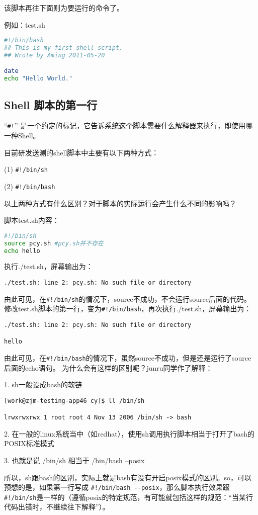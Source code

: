 该脚本再往下面则为要运行的命令了。

例如：test.sh
\begin{lstlisting}[language=sh]
#!/bin/bash
## This is my first shell script.
## Wrote by Aming 2011-05-20

date
echo "Hello World."
\end{lstlisting}



\subsection{Shell 脚本的第一行}
“\verb|#!|” 是一个约定的标记，它告诉系统这个脚本需要什么解释器来执行，即使用哪一种Shell。

目前研发送测的shell脚本中主要有以下两种方式：

(1) \verb|#!/bin/sh|

(2) \verb|#!/bin/bash|

以上两种方式有什么区别？对于脚本的实际运行会产生什么不同的影响吗？

脚本test.sh内容：
\begin{lstlisting}[language=sh]
#!/bin/sh
source pcy.sh #pcy.sh并不存在
echo hello
\end{lstlisting}
执行./test.sh，屏幕输出为：

\verb|./test.sh: line 2: pcy.sh: No such file or directory|

由此可见，在\verb|#!/bin/sh|的情况下，source不成功，不会运行source后面的代码。修改test.sh脚本的第一行，变为\verb|#!/bin/bash|，再次执行./test.sh，屏幕输出为：
\begin{verbatim}
./test.sh: line 2: pcy.sh: No such file or directory

hello
\end{verbatim}

由此可见，在\verb|#!/bin/bash|的情况下，虽然source不成功，但是还是运行了source后面的echo语句。
为什么会有这样的区别呢？junru同学作了解释：

1. sh一般设成bash的软链
\begin{verbatim}
[work@zjm-testing-app46 cy]$ ll /bin/sh

lrwxrwxrwx 1 root root 4 Nov 13 2006 /bin/sh -> bash
\end{verbatim}

2. 在一般的linux系统当中（如redhat），使用sh调用执行脚本相当于打开了bash的POSIX标准模式

3. 也就是说 /bin/sh 相当于 /bin/bash --posix

所以，sh跟bash的区别，实际上就是bash有没有开启posix模式的区别。so，可以预想的是，如果第一行写成 \verb|#!/bin/bash --posix|，那么脚本执行效果跟\verb|#!/bin/sh|是一样的（遵循posix的特定规范，有可能就包括这样的规范：“当某行代码出错时，不继续往下解释”）。



